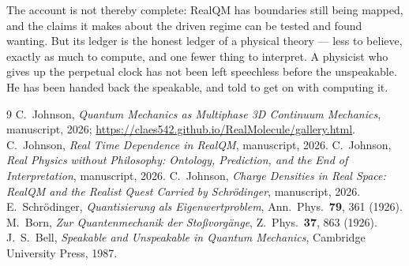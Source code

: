 \documentclass[11pt]{article}
\begin{document}
The account is not thereby complete: RealQM has boundaries still being mapped, and the claims it makes about
the driven regime can be tested and found wanting. But its ledger is the honest ledger of a physical theory ---
less to believe, exactly as much to compute, and one fewer thing to interpret. A physicist who gives up the
perpetual clock has not been left speechless before the unspeakable. He has been handed back the speakable, and
told to get on with computing it.

\begin{thebibliography}{9}
 C.~Johnson, \emph{Quantum Mechanics as Multiphase 3D Continuum Mechanics}, manuscript,
2026; \url{https://claes542.github.io/RealMolecule/gallery.html}.
 C.~Johnson, \emph{Real Time Dependence in RealQM}, manuscript, 2026.
 C.~Johnson, \emph{Real Physics without Philosophy: Ontology, Prediction, and the End of
Interpretation}, manuscript, 2026.
 C.~Johnson, \emph{Charge Densities in Real Space: RealQM and the Realist Quest Carried by
Schr\"odinger}, manuscript, 2026.
 E.~Schr\"odinger, \emph{Quantisierung als Eigenwertproblem}, Ann.\ Phys.\ \textbf{79},
361 (1926).
 M.~Born, \emph{Zur Quantenmechanik der Sto\ss vorg\"ange}, Z.\ Phys.\ \textbf{37}, 863
(1926).
 J.~S.~Bell, \emph{Speakable and Unspeakable in Quantum Mechanics}, Cambridge University
Press, 1987.
\end{thebibliography}
\end{document}
